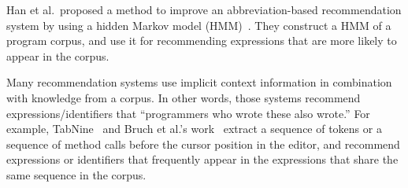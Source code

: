 \documentclass[PRO,english]{ipsj}
\begin{document}
Han et al.\ proposed a method to improve an abbreviation-based recommendation system by using a hidden Markov model (HMM)~\cite{Sangmok}.  They construct a HMM of a program corpus, and use it for recommending expressions that are more likely to appear in the corpus.






Many recommendation systems use implicit context information in combination with knowledge from a corpus.  In other words, those systems recommend expressions/identifiers that ``programmers who wrote these also wrote.'' 
For example, TabNine~\cite{TabNine} and Bruch et al.'s work~\cite{Marcel} extract a sequence of tokens or a sequence of method calls before the cursor position in the editor, and recommend expressions or identifiers that frequently appear in the expressions that share the same sequence in the corpus.  %



\end{document}
